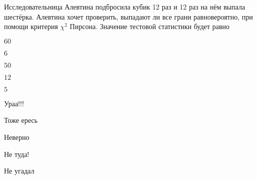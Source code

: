 
\begin{question}
Исследовательница Алевтина подбросила кубик 12 раз и 12 раз на нём
выпала шестёрка. Алевтина хочет проверить, выпадают ли все грани
равновероятно, при помощи критерия \(\chi^2\) Пирсона. Значение тестовой
статистики будет равно
\begin{answerlist}
  \item \(60\)
  \item \(6\)
  \item \(50\)
  \item \(12\)
  \item \(5\)
\end{answerlist}
\end{question}

\begin{solution}
\begin{answerlist}
  \item Ураа!!!
  \item Тоже ересь
  \item Неверно
  \item Не туда!
  \item Не угадал
\end{answerlist}
\end{solution}

